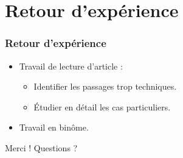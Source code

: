 \documentclass{beamer}
\begin{document}
\section{Retour d'expérience}

\begin{frame}
\frametitle{Retour d'expérience}
\begin{itemize}
\item Travail de lecture d'article :
	\begin{itemize}
	\item Identifier les passages trop techniques.
	\item Étudier en détail les cas particuliers.
	\end{itemize}
\item Travail en binôme.
\end{itemize}
\end{frame}


\begin{frame}
\Huge \center Merci !
\huge\center Questions ?
\end{frame}


\begin{frame}
\end{frame} %
\end{document}
